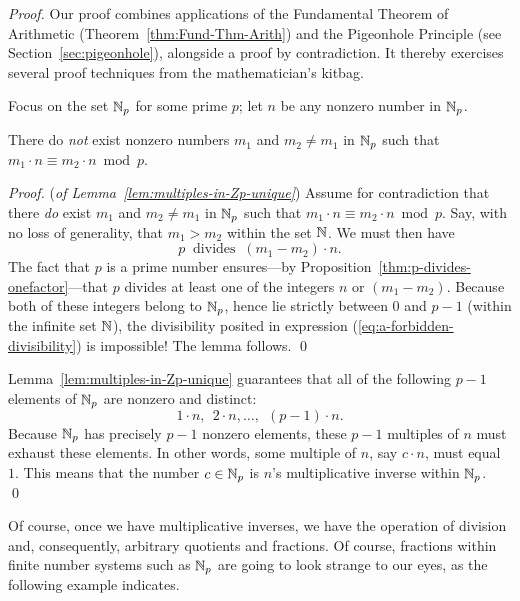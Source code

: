 \begin{proof}
Our proof combines applications of the Fundamental Theorem of Arithmetic (Theorem~\ref{thm:Fund-Thm-Arith}) and the Pigeonhole Principle (see Section~\ref{sec:pigeonhole}), alongside a proof by contradiction.  It thereby exercises several proof techniques from the mathematician's kitbag.

\smallskip

Focus on the set $\mathbb{N}_p$ for some prime $p$; let $n$ be any nonzero number in $\mathbb{N}_p$.  

\begin{lemma}
\label{lem:multiples-in-Zp-unique}
There do {\em not} exist nonzero numbers $m_1$ and $m_2 \neq m_1$ in $\mathbb{N}_p$ such that $m_1 \cdot n \equiv m_2 \cdot n \bmod p$.
\end{lemma}

\begin{proof} ({\em of Lemma~\ref{lem:multiples-in-Zp-unique}})
Assume for contradiction that there {\em do} exist $m_1$ and $m_2 \neq m_1$ in $\mathbb{N}_p$ such that $m_1 \cdot n \equiv m_2 \cdot n \bmod p$.  Say, with no loss of generality, that $m_1 > m_2$ within the set $\mathbb{N}$.  We must then have
\begin{equation}
\label{eq:a-forbidden-divisibility}
p \ \mbox{ divides } \ (m_1 - m_2) \cdot n.
\end{equation}
The fact that $p$ is a prime number ensures---by Proposition~\ref{thm:p-divides-onefactor}---that $p$ divides at least one of the integers $n$ or $(m_1 - m_2)$.  Because both of these integers belong to $\mathbb{N}_p$, hence lie strictly between $0$ and $p-1$ (within the infinite set $\mathbb{N}$), the divisibility posited in expression
(\ref{eq:a-forbidden-divisibility}) is impossible!  The lemma follows.  \qed
\end{proof}

Lemma~\ref{lem:multiples-in-Zp-unique} guarantees that all of the following $p-1$ elements of $\mathbb{N}_p$ are nonzero and distinct:
\[ 1 \cdot n, \ \ 2 \cdot n, \ldots, \ \ (p-1) \cdot n. \]
Because $\mathbb{N}_p$ has precisely $p-1$ nonzero elements, these $p-1$ multiples of $n$ must exhaust these elements.  In other words, some multiple of $n$, say $c \cdot n$, must equal $1$.  This means that the number $c \in \mathbb{N}_p$ is $n$'s multiplicative inverse within $\mathbb{N}_p$.  \qed
\end{proof}

\medskip

Of course, once we have multiplicative inverses, we have the operation of division and, consequently, arbitrary quotients and fractions.  Of course, fractions within finite number systems such as $\mathbb{N}_p$ are going to look strange to our eyes, as the following example indicates.


